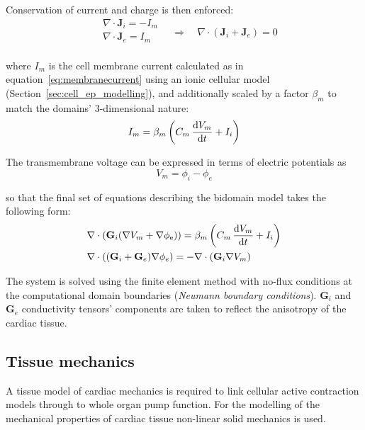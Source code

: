 \vspace{0.2cm}\noindent
Conservation of current and charge is then enforced:
%
\begin{equation}
    \begin{aligned}
        & \nabla\cdot\mathbf{J}_i = -I_m \\
        & \nabla\cdot\mathbf{J}_e =  I_m \\
    \end{aligned}\quad\Rightarrow\quad \nabla\cdot(\mathbf{J}_i+\mathbf{J}_e) = 0
\end{equation}

\noindent
where $I_m$ is the cell membrane current calculated as in equation~\eqref{eq:membranecurrent} using an ionic cellular model (Section~\ref{sec:cell_ep_modelling}), and additionally scaled by a factor $\beta_m$ to match the domains' $3$-dimensional nature:
%
\begin{equation}\label{eq:membranecurrentsc}
    I_m = \beta_m\left(C_m\,\dfrac{\mathrm{d}{V_m}}{\mathrm{d}{t}} + I_i\right)
\end{equation}

\noindent
The transmembrane voltage can be expressed in terms of electric potentials as
%
\begin{equation}
    V_m = \phi_i - \phi_e
\end{equation}

\noindent
so that the final set of equations describing the bidomain model takes the following form:
%
\begin{align}\label{eq:bidomainmodel}
    & \nabla\cdot(\mathbf{G}_i(\nabla V_m + \nabla \phi_{\text{e}})) = \beta_m\left(C_m\,\dfrac{\mathrm{d}{V_m}}{\mathrm{d}{t}} + I_i\right) \\
    & \nabla\cdot((\mathbf{G}_i + \mathbf{G}_e)\nabla \phi_e) = -\nabla\cdot(\mathbf{G}_i\nabla V_m)
\end{align}

\noindent
The system is solved using the finite element method with no-flux conditions at the computational domain boundaries (\textit{Neumann boundary conditions}). $\mathbf{G}_i$ and $\mathbf{G}_e$ conductivity tensors' components are taken to reflect the anisotropy of the cardiac tissue.


%
%
%
\subsection{Tissue mechanics}\label{sec:tissue_mech_math_modelling}
A tissue model of cardiac mechanics is required to link cellular active contraction models through to whole organ pump function. For the modelling of the mechanical properties of cardiac tissue non-linear solid mechanics is used.

